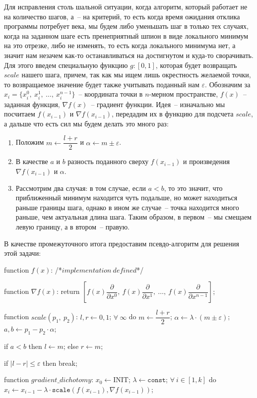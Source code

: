 \documentclass[12pt, a4paper, oneside, final]{article}
\begin{document}
	Для исправления столь шальной ситуации, когда алгоритм, который работает не на количество шагов, а~-- на критерий, то есть когда время ожидания отклика программы потребует века, мы будем либо уменьшать шаг в только тех случаях, когда на заданном шаге есть пренеприятный шпион в виде локального минимум на это отрезке, либо не изменять, то есть когда локального минимума нет, а значит нам незачем как-то останавливаться на достигнутом и куда-то сворачивать. Для этого введем специальную функцию $g : [0, 1]$, которая будет возвращать $scale$ нашего шага, причем, так как мы ищем лишь окрестность желаемой точки, то возвращаемое значение будет также учитывать поданный нам $\varepsilon$. Обозначим за $x_{i} = \{x^0_{i}, ~ x^1_{i}, ~ \ldots, ~ x^{n - 1}_i\}$~-- координата точки в $n$-мерном пространстве, $f(x)$~-- заданная функция, $\nabla{f(x)}$~-- градиент функции. Идея~-- изначально мы посчитаем $f(x_{i - 1})$ и $\nabla{f(x_{i - 1})}$, передадим их в функцию для подсчета $scale$, а дальше что есть сил мы будем делать это много раз:
	\begin{enumerate}[(1)]
		\item Положим $m \gets \dfrac{l + r}{2}$ и $\alpha \gets m \pm \varepsilon$.
		\item В качестве $a$ и $b$ разность поданного сверху $f(x_{i - 1})$ и произведения $\nabla{f(x_{i - 1})}$ и $\alpha$.
		\item Рассмотрим два случая: в том случае, если $a < b$, то это значит, что приближенный минимум находится чуть подальше, но может находиться раньше границы шага, однако в ином же случае~-- точка находится много раньше, чем актуальная длина шага. Таким образом, в первом~-- мы смещаем левую границу, а в втором~-- правую.
	\end{enumerate}
	В качестве промежуточного итога предоставим псевдо-алгоритм для решения этой задачи:
	\begin{pseudocode}
function $f(x)$:
	/*$implementation~defined$*/

function $\nabla{f(x)}$:
	return $\left[f(x)\dfrac{\partial}{\partial{x^{0}}}, ~ f(x)\dfrac{\partial}{\partial{x^{1}}}, ~ \ldots, ~ f(x)\dfrac{\partial}{\partial{x^{n - 1}}}\right]$;

function $scale(p_1, ~ p_2)$:
	$l, r \gets 0, 1$;
	$\forall~\infty$ do
		$m \gets \dfrac{l + r}{2}$;
		$\alpha \gets \lambda \cdot (m \pm \varepsilon)$;
		$a, b \gets p_1 - p_2 \cdot \alpha$;

		if $a < b$ then
			$l \gets m$;
		else
			$r \gets m$;

		if $|l - r| \leqslant \varepsilon$ then
			break;

function $gradient\_dichotomy$:
	$x_{0} \gets \text{INIT}$;
	$\lambda \gets \texttt{const}$;
	$\forall~i \in [1, k]$ do
		$x_{i} \gets x_{i - 1} - \lambda \cdot \texttt{scale}(f(x_{i - 1}), \nabla{f(x_{i - 1})})$;
	\end{pseudocode}
\end{document}
